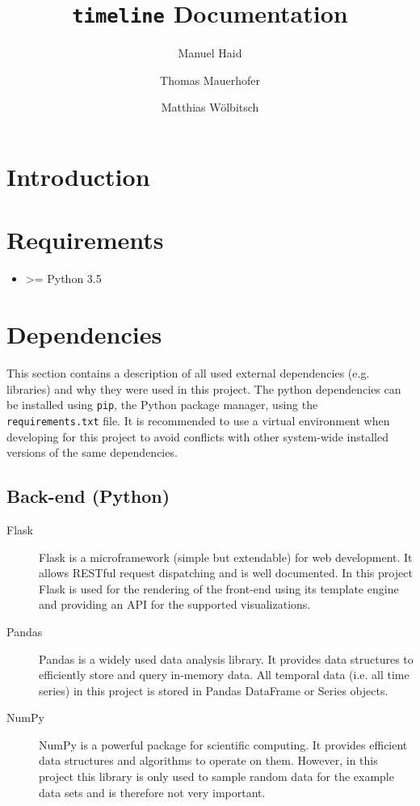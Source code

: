 \documentclass[11pt, a4paper]{article}
\author{Manuel Haid \and Thomas Mauerhofer \and Matthias Wölbitsch}
\title{\texttt{timeline} Documentation}
\begin{document}
\maketitle
\tableofcontents

\section{Introduction} \label{sec:intoduction}


\section{Requirements} \label{sec:requirments}

\begin{itemize}
 \item \textgreater= Python 3.5
\end{itemize}
 

\section{Dependencies}\label{sec:dependencies}

This section contains a description of all used external dependencies (e.g. libraries) and why they were used in this project.
The python dependencies can be installed using \texttt{pip}, the Python package manager, using the \texttt{requirements.txt} file. 
It is recommended to use a virtual environment when developing for this project to avoid conflicts with other system-wide installed versions of the same dependencies.


\subsection{Back-end (Python)}

\begin{description}
 \item[Flask] 
 Flask is a microframework (simple but extendable) for web development. 
 It allows RESTful request dispatching and is well documented. 
 In this project Flask is used for the rendering of the front-end using its template engine and providing an API for the supported visualizations.
 
 \item[Pandas] 
 Pandas is a widely used data analysis library. 
 It provides data structures to efficiently store and query in-memory data. 
 All temporal data (i.e. all time series) in this project is stored in Pandas DataFrame or Series objects. 
 
 \item[NumPy] 
 NumPy is a powerful package for scientific computing. 
 It provides efficient data structures and algorithms to operate on them. 
 However, in this project this library is only used to sample random data for the example data sets and is therefore not very important. 
\end{description}
\end{document}
